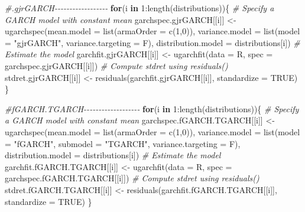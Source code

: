 \documentclass[a4paper, twoside]{templates/ociamthesis}
\newenvironment{Shaded}{\begin{snugshade}}{\end{snugshade}}
\newcommand{\AttributeTok}[1]{\textcolor[rgb]{0.77,0.63,0.00}{#1}}
\newcommand{\CommentTok}[1]{\textcolor[rgb]{0.56,0.35,0.01}{\textit{#1}}}
\newcommand{\ConstantTok}[1]{\textcolor[rgb]{0.00,0.00,0.00}{#1}}
\newcommand{\ControlFlowTok}[1]{\textcolor[rgb]{0.13,0.29,0.53}{\textbf{#1}}}
\newcommand{\DecValTok}[1]{\textcolor[rgb]{0.00,0.00,0.81}{#1}}
\newcommand{\FunctionTok}[1]{\textcolor[rgb]{0.00,0.00,0.00}{#1}}
\newcommand{\NormalTok}[1]{#1}
\newcommand{\OtherTok}[1]{\textcolor[rgb]{0.56,0.35,0.01}{#1}}
\newcommand{\SpecialCharTok}[1]{\textcolor[rgb]{0.00,0.00,0.00}{#1}}
\newcommand{\StringTok}[1]{\textcolor[rgb]{0.31,0.60,0.02}{#1}}
\renewenvironment{Shaded}
{
  \vspace{10pt}%
  \begin{snugshade}%
}{%
  \end{snugshade}%
  \vspace{8pt}%
}
\begin{document}
\begin{Shaded}
\begin{Highlighting}[]
\CommentTok{\#.gjrGARCH{-}{-}{-}{-}{-}{-}{-}{-}{-}{-}{-}{-}{-}{-}{-}{-}{-}{-}}
\ControlFlowTok{for}\NormalTok{(i }\ControlFlowTok{in} \DecValTok{1}\SpecialCharTok{:}\FunctionTok{length}\NormalTok{(distributions))\{}
\CommentTok{\# Specify a GARCH model with constant mean}
\NormalTok{garchspec.gjrGARCH[[i]] }\OtherTok{\textless{}{-}} \FunctionTok{ugarchspec}\NormalTok{(}\AttributeTok{mean.model =} \FunctionTok{list}\NormalTok{(}\AttributeTok{armaOrder =} \FunctionTok{c}\NormalTok{(}\DecValTok{1}\NormalTok{,}\DecValTok{0}\NormalTok{)),}
                     \AttributeTok{variance.model =} \FunctionTok{list}\NormalTok{(}\AttributeTok{model =} \StringTok{"gjrGARCH"}\NormalTok{, }\AttributeTok{variance.targeting =}\NormalTok{ F), }
                     \AttributeTok{distribution.model =}\NormalTok{ distributions[i])}
\CommentTok{\# Estimate the model}
\NormalTok{garchfit.gjrGARCH[[i]] }\OtherTok{\textless{}{-}} \FunctionTok{ugarchfit}\NormalTok{(}\AttributeTok{data =}\NormalTok{ R, }\AttributeTok{spec =}\NormalTok{ garchspec.gjrGARCH[[i]])}
\CommentTok{\# Compute stdret using residuals()}
\NormalTok{stdret.gjrGARCH[[i]] }\OtherTok{\textless{}{-}} \FunctionTok{residuals}\NormalTok{(garchfit.gjrGARCH[[i]], }\AttributeTok{standardize =} \ConstantTok{TRUE}\NormalTok{)}
\NormalTok{\}}

\CommentTok{\#fGARCH.TGARCH{-}{-}{-}{-}{-}{-}{-}{-}{-}{-}{-}{-}{-}{-}{-}{-}{-}{-}{-}}
\ControlFlowTok{for}\NormalTok{(i }\ControlFlowTok{in} \DecValTok{1}\SpecialCharTok{:}\FunctionTok{length}\NormalTok{(distributions))\{}
\CommentTok{\# Specify a GARCH model with constant mean}
\NormalTok{garchspec.fGARCH.TGARCH[[i]] }\OtherTok{\textless{}{-}} \FunctionTok{ugarchspec}\NormalTok{(}\AttributeTok{mean.model =} \FunctionTok{list}\NormalTok{(}\AttributeTok{armaOrder =} \FunctionTok{c}\NormalTok{(}\DecValTok{1}\NormalTok{,}\DecValTok{0}\NormalTok{)),}
                     \AttributeTok{variance.model =} \FunctionTok{list}\NormalTok{(}\AttributeTok{model =} \StringTok{"fGARCH"}\NormalTok{, }\AttributeTok{submodel =} \StringTok{"TGARCH"}\NormalTok{, }\AttributeTok{variance.targeting =}\NormalTok{ F), }
                     \AttributeTok{distribution.model =}\NormalTok{ distributions[i])}
\CommentTok{\# Estimate the model}
\NormalTok{garchfit.fGARCH.TGARCH[[i]] }\OtherTok{\textless{}{-}} \FunctionTok{ugarchfit}\NormalTok{(}\AttributeTok{data =}\NormalTok{ R, }\AttributeTok{spec =}\NormalTok{ garchspec.fGARCH.TGARCH[[i]])}
\CommentTok{\# Compute stdret using residuals()}
\NormalTok{stdret.fGARCH.TGARCH[[i]] }\OtherTok{\textless{}{-}} \FunctionTok{residuals}\NormalTok{(garchfit.fGARCH.TGARCH[[i]], }\AttributeTok{standardize =} \ConstantTok{TRUE}\NormalTok{)}
\NormalTok{\}}


\end{Highlighting}
\end{Shaded}
\end{document}
